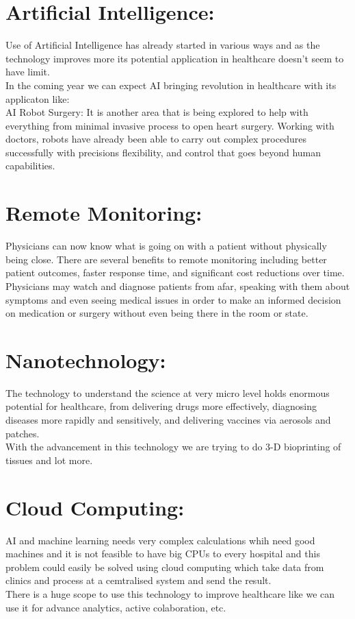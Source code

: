 \documentclass[a4paper,12pt]{article}
\begin{document}
	\section{Artificial Intelligence:}
 Use of Artificial Intelligence has already started in various ways and as the technology improves more its potential application in healthcare doesn't seem to have limit.
 \\
 In the coming year we can expect AI bringing revolution in healthcare with its applicaton like:
 \\
 AI Robot Surgery: It is another area that is being explored to help with everything from minimal invasive process to open heart surgery. Working with doctors, robots have already been able to carry out complex procedures successfully with precisions flexibility, and control that goes beyond human capabilities.
 
 \section{Remote Monitoring:}
 Physicians can now know what is going on with a patient without physically being close. There are several benefits to remote monitoring including better patient outcomes, faster response time, and significant cost reductions over time.
 \\
 Physicians may watch and diagnose patients from afar, speaking
  with them about symptoms and even seeing medical 
 issues in order to make an informed decision on medication or surgery without even being there in the room or state.
 
 \section{Nanotechnology:}
 The technology to understand the science at very micro level holds enormous potential for healthcare, from delivering drugs more effectively,
 diagnosing diseases more rapidly and sensitively, and delivering vaccines via aerosols and patches.
 \\
 With the advancement in this technology we are trying to do 3-D bioprinting of tissues and lot more.
 
 \section{Cloud Computing:}
AI and machine learning needs very complex calculations whih need good machines and it is not feasible to have big CPUs to every hospital and this problem could easily be solved using cloud computing which take data from clinics and process at a cemtralised system and send the result.
\\
There is a huge scope to use this technology to improve healthcare like we can use it for advance analytics, active colaboration, etc.

	
\end{document}
